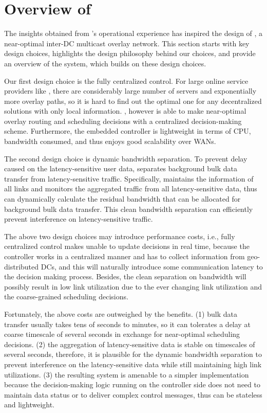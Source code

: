 \section{Overview of \name}
\label{sec:overview}

The insights obtained from \company's operational experience has inspired the design of \name, a near-optimal inter-DC multicast overlay network. This section starts with \name key design choices, highlights the design philosophy behind our choices, and provide an overview of the \name system, which builds on these design choices.

Our first design choice is the fully centralized control. For large online service providers like \company, there are considerably large number of servers and exponentially more overlay paths, so it is hard to find out the optimal one for any decentralized solutions with only local information. \name, however is able to make near-optimal overlay routing and scheduling decisions with a centralized decision-making scheme. Furthermore, the embedded controller is lightweight in terms of CPU, bandwidth consumed, and thus enjoys good scalability over WANs.

The second design choice is dynamic bandwidth separation. To prevent delay caused on the latency-sensitive user data, \name separates background bulk data transfer from latency-sensitive traffic. Specifically, \name maintains the information of all links and monitors the aggregated traffic from all latency-sensitive data, thus can dynamically calculate the residual bandwidth that can be allocated for background bulk data transfer. This clean bandwidth separation can efficiently prevent interference on latency-sensitive traffic.

The above two design choices may introduce performance costs, i.e., fully centralized control makes \name unable to update decisions in real time, because the \name controller works in a centralized manner and has to collect information from geo-distributed DCs, and this will naturally introduce some communication latency to the decision making process. Besides, the clean separation on bandwidth will possibly result in low link utilization due to the ever changing link utilization and the coarse-grained scheduling decisions.

Fortunately, the above costs are outweighed by the benefits. (1) bulk data transfer usually takes tens of seconds to minutes, so it can tolerates a delay at coarse timescale of several seconds in exchange for near-optimal scheduling decisions. (2) the aggregation of latency-sensitive data is stable on timescales of several seconds, therefore, it is plausible for the dynamic bandwidth separation to prevent interference on the latency-sensitive data while still maintaining high link utilizations. (3) the resulting system is amenable to a simpler implementation because the decision-making logic running on the controller side does not need to maintain data status or to deliver complex control messages, thus can be stateless and lightweight.

